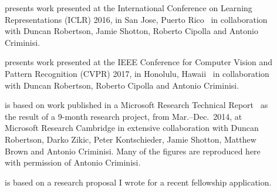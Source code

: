 \begin{acknowledgements}
\begin{description}
	\item[] presents work presented at the International Conference on Learning Representations (ICLR) 2016, in San Jose, Puerto Rico~\citep{Ioannou2016} in collaboration with Duncan Robertson, Jamie Shotton, Roberto Cipolla and Antonio Criminisi.

	\item[] presents work presented at the IEEE Conference for Computer Vision and Pattern Recognition (CVPR) 2017, in Honolulu, Hawaii~\citep{ioannou2016e} in collaboration with Duncan Robertson, Roberto Cipolla and Antonio Criminisi.
	
	\item[] is based on work published in a Microsoft Research Technical Report~\citep{Ioannou2015} as the result of a 9-month research project, from Mar.--Dec.~2014, at Microsoft Research Cambridge in extensive collaboration with Duncan Robertson, Darko Zikic, Peter Kontschieder, Jamie Shotton, Matthew Brown and Antonio Criminisi. Many of the figures are reproduced here with permission of Antonio Criminisi.

	\item[] is based on a research proposal I wrote for a recent fellowship application.
\end{description}


\end{acknowledgements}
